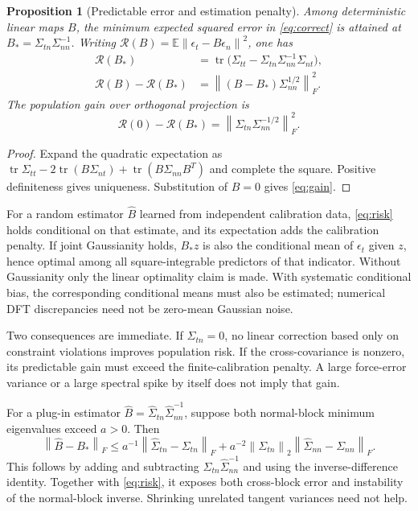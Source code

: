 \documentclass[11pt]{article}
\newtheorem{proposition}{Proposition}
\newcommand{\E}{\mathbb{E}}
\newcommand{\tr}{\operatorname{tr}}
\newcommand{\norm}[1]{\left\lVert #1\right\rVert}
\begin{document}
\begin{proposition}[Predictable error and estimation penalty]
Among deterministic linear maps $B$, the minimum expected squared error in
\eqref{eq:correct} is attained at $B_* =\Sigma_{tn}\Sigma_{nn}^{-1}$. Writing
$\mathcal R(B)=\E\norm{\epsilon_t-B\epsilon_n}^2$, one has
\begin{align}
 \mathcal R(B_*)&=\tr\bigl(\Sigma_{tt}-\Sigma_{tn}\Sigma_{nn}^{-1}\Sigma_{nt}\bigr),\label{eq:oracle}\\
 \mathcal R(B)-\mathcal R(B_*)&=
 \norm{(B-B_*)\Sigma_{nn}^{1/2}}_F^2.\label{eq:risk}
\end{align}
The population gain over orthogonal projection is
\begin{equation}\label{eq:gain}
 \mathcal R(0)-\mathcal R(B_*)=
 \norm{\Sigma_{tn}\Sigma_{nn}^{-1/2}}_F^2.
\end{equation}
\end{proposition}
\begin{proof}
Expand the quadratic expectation as
$\tr\Sigma_{tt}-2\tr(B\Sigma_{nt})+\tr(B\Sigma_{nn}B^T)$ and complete the square.
Positive definiteness gives uniqueness. Substitution of $B=0$ gives \eqref{eq:gain}.
\end{proof}

For a random estimator $\widehat B$ learned from independent calibration data,
\eqref{eq:risk} holds conditional on that estimate, and its expectation adds the
calibration penalty. If joint Gaussianity holds, $B_*z$ is also the conditional mean
of $\epsilon_t$ given $z$, hence optimal among all square-integrable predictors of
that indicator. Without Gaussianity only the linear optimality claim is made.
With systematic conditional bias, the corresponding conditional means must also
be estimated; numerical DFT discrepancies need not be zero-mean Gaussian noise.

Two consequences are immediate. If $\Sigma_{tn}=0$, no linear correction based
only on constraint violations improves population risk. If the cross-covariance is
nonzero, its predictable gain must exceed the finite-calibration penalty. A large
force-error variance or a large spectral spike by itself does not imply that gain.

For a plug-in estimator $\widehat B=\widehat\Sigma_{tn}\widehat\Sigma_{nn}^{-1}$,
suppose both normal-block minimum eigenvalues exceed $a>0$. Then
\begin{equation}\label{eq:bound}
 \norm{\widehat B-B_*}_F\le
 a^{-1}\norm{\widehat\Sigma_{tn}-\Sigma_{tn}}_F+
 a^{-2}\norm{\Sigma_{tn}}_2\norm{\widehat\Sigma_{nn}-\Sigma_{nn}}_F.
\end{equation}
This follows by adding and subtracting
$\Sigma_{tn}\widehat\Sigma_{nn}^{-1}$ and using the inverse-difference identity.
Together with \eqref{eq:risk}, it exposes both cross-block error and instability of
the normal-block inverse. Shrinking unrelated tangent variances need not help.
\end{document}
